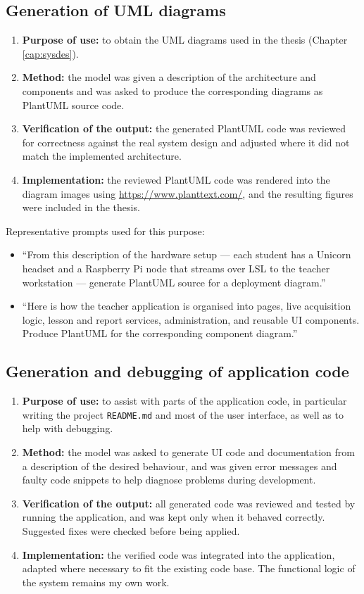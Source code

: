 \documentclass[12pt,a4paper,openany]{book}
\theoremstyle{definition}
\theoremstyle{remark}
\begin{document}
\subsection*{Generation of UML diagrams}
\begin{enumerate}
    \item \textbf{Purpose of use:} to obtain the UML diagrams used in the thesis (Chapter \ref{cap:sysdes}).
    \item \textbf{Method:} the model was given a description of the architecture and components and was asked to produce the corresponding diagrams as PlantUML source code.
    \item \textbf{Verification of the output:} the generated PlantUML code was reviewed for correctness against the real system design and adjusted where it did not match the implemented architecture.
    \item \textbf{Implementation:} the reviewed PlantUML code was rendered into the diagram images using \url{https://www.planttext.com/}, and the resulting figures were included in the thesis.
\end{enumerate}

\noindent Representative prompts used for this purpose:
\begin{itemize}
    \item ``From this description of the hardware setup --- each student has a Unicorn headset and a Raspberry Pi node that streams over LSL to the teacher workstation --- generate PlantUML source for a deployment diagram.''
    \item ``Here is how the teacher application is organised into pages, live acquisition logic, lesson and report services, administration, and reusable UI components. Produce PlantUML for the corresponding component diagram.''
\end{itemize}

\subsection*{Generation and debugging of application code}
\begin{enumerate}
    \item \textbf{Purpose of use:} to assist with parts of the application code, in particular writing the project \texttt{README.md} and most of the user interface, as well as to help with debugging.
    \item \textbf{Method:} the model was asked to generate UI code and documentation from a description of the desired behaviour, and was given error messages and faulty code snippets to help diagnose problems during development.
    \item \textbf{Verification of the output:} all generated code was reviewed and tested by running the application, and was kept only when it behaved correctly. Suggested fixes were checked before being applied.
    \item \textbf{Implementation:} the verified code was integrated into the application, adapted where necessary to fit the existing code base. The functional logic of the system remains my own work.
\end{enumerate}
\end{document}
